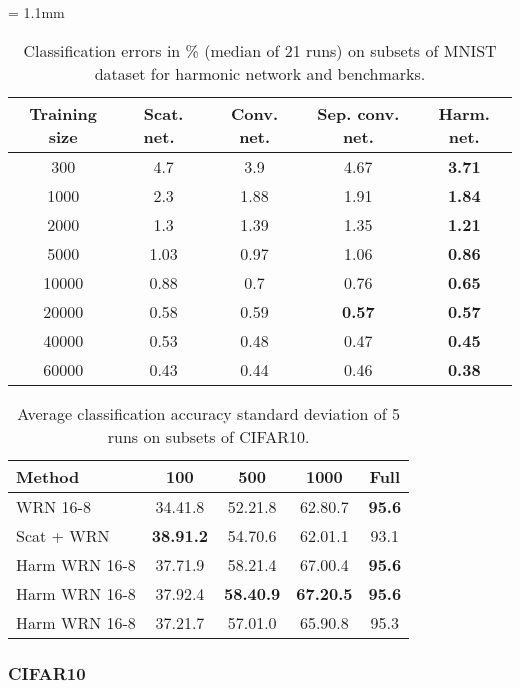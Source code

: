 \documentclass[conference]{IEEEtran}
\begin{document}
\begin{table}
\centering
\tabcolsep = 1.1mm
\caption{Classification errors in \% (median of 21 runs) on subsets of MNIST dataset for harmonic network and benchmarks.} \label{tab:lim_data_mnist}
 \begin{tabular}{|c|cccc|}
  \hline
  \footnotesize{Training size} & \footnotesize{Scat. net.~\cite{Bruna13}} & \footnotesize{Conv. net.} & \footnotesize{Sep. conv. net.} & \footnotesize{Harm. net.} \\
  \hline
  300 & 4.7 & 3.9 & 4.67 & \textbf{3.71} \\
  1000 & 2.3 & 1.88 & 1.91 & \textbf{1.84} \\
  2000 & 1.3 & 1.39 & 1.35 & \textbf{1.21} \\
  5000 & 1.03 & 0.97 & 1.06 & \textbf{0.86} \\
  10000 & 0.88 & 0.7 & 0.76 & \textbf{0.65} \\
  20000 & 0.58 & 0.59 & \textbf{0.57} & \textbf{0.57} \\
  40000 & 0.53 & 0.48 & 0.47 & \textbf{0.45} \\
  60000 & 0.43 & 0.44 & 0.46 & \textbf{0.38} \\
  \hline
 \end{tabular}
\end{table}

\begin{table}
\centering
\caption{Average classification accuracy  standard deviation of 5 runs on subsets of CIFAR10.} \label{tab:lim_data_cifar}
\begin{tabular}{|l|c|c|c|c|}
 \hline
 \textbf{Method} & \textbf{100} & \textbf{500} & \textbf{1000} & \textbf{Full} \\
 \hline
 WRN 16-8 & 34.41.8 & 52.21.8 & 62.80.7 & \textbf{95.6} \\
 Scat + WRN~\cite{Oyallon18} & \textbf{38.91.2} & 54.70.6 & 62.01.1 & 93.1 \\
 Harm WRN 16-8 & 37.71.9 & 58.21.4 & 67.00.4 & \textbf{95.6} \\
 Harm WRN 16-8  & 37.92.4 & \textbf{58.40.9} & \textbf{67.20.5} & \textbf{95.6} \\
 Harm WRN 16-8  & 37.21.7 & 57.01.0 & 65.90.8 & 95.3 \\
 \hline
\end{tabular}
\end{table}

\subsubsection{CIFAR10}
\end{document}

